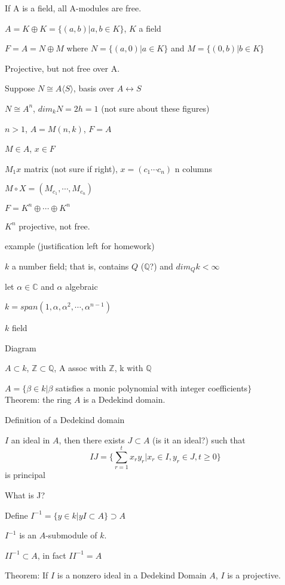 \documentclass[12pt]{article}
\newcommand{\inv}{^{-1}}
\begin{document}
If A is a field, all A-modules are free.

\noindent
$A = K \oplus K = \{(a, b) | a, b \in K\}$, $K$ a field

$F = A = N \oplus M$ where $N = \{(a, 0)| a \in K\}$ and $M = \{(0, b) | b \in K\}$

Projective, but not free over A.

Suppose $N \cong A\langle S\rangle$, basis over $A \leftrightarrow S$

$N \cong A^n$, $dim_kN = 2h = 1$ (not sure about these figures)

$n > 1$, $A = M(n, k)$, $F = A$

$M \in A$, $x \in F$

$M_1x$ matrix (not sure if right), $x = (c_1 \cdots c_n)$ n columns

$M \circ X = (M_{c_1}, \cdots, M_{c_n})$

$F = K^n \oplus \cdots \oplus K^n$

$K^n$ projective, not free.

\noindent
example (justification left for homework)

$k$ a number field; that is, contains $Q$ ($\mathds{Q}$?) and $dim_Qk < \infty$

let $\alpha \in \mathds{C}$ and $\alpha$ algebraic

$k = span(1, \alpha, \alpha^2, \cdots, \alpha^{n - 1})$

$k$ field

\noindent
Diagram

$A \subset k$, $\mathds{Z} \subset \mathds{Q}$, A assoc with $\mathds{Z}$, k with $\mathds{Q}$

\noindent
$A = \{\beta \in k| \beta$ satisfies a monic polynomial with integer coefficients$\}$\\

\noindent
Theorem: the ring $A$ is a Dedekind domain.

\noindent
Definition of a Dedekind domain

$I$ an ideal in $A$, then there exists $J \subset A$ (is it an ideal?) such that$$IJ = \{\sum_{r = 1}^t x_r y_r | x_r \in I, y_r \in J, t \geq 0\}$$ is principal

What is J?

Define $I\inv = \{y \in k | yI \subset A\} \supset A$

$I\inv$ is an $A$-submodule of $k$.

$II\inv \subset A$, in fact $II\inv = A$

\noindent
Theorem: If $I$ is a nonzero ideal in a Dedekind Domain $A$, $I$ is a projective.
\end{document}
